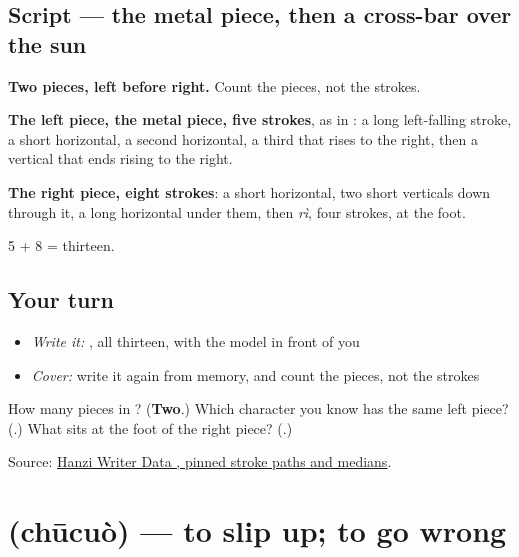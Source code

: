 \subsection*{Script — the metal piece, then a cross-bar over the sun}

\begin{quote}
\end{quote}

\textbf{Two pieces, left before right.} Count the pieces, not the strokes.

\textbf{The left piece, the metal piece, five strokes}, as in : a long left-falling stroke, a short horizontal, a second horizontal, a third that rises to the right, then a vertical that ends rising to the right.

\textbf{The right piece, eight strokes}: a short horizontal, two short verticals down through it, a long horizontal under them, then  \emph{rì}, four strokes, at the foot.

5 + 8 = thirteen.

\subsection*{Your turn}
\begin{itemize}
\raggedright
  \item \emph{Write it:} , all thirteen, with the model in front of you
  \item \emph{Cover:} write it again from memory, and count the pieces, not the strokes
\end{itemize}

\begin{tcolorbox}[breakable,colback=teal!4,colframe=teal!35!black,title={Before you move on}]
How many pieces in ? (\textbf{Two}.) Which character you know has the same left piece? (\textbf{}.) What sits at the foot of the right piece? (\textbf{}.)

Source: \href{https://raw.githubusercontent.com/chanind/hanzi-writer-data/68d10a4b21150cae5e1ebbd223eed289cf32d90c/data/\%E9\%94\%99.json}{Hanzi Writer Data , pinned stroke paths and medians}.
\end{tcolorbox}
\section[\texorpdfstring{\zh{出错} (chūcuò)}{出错 (chūcuò)}]{ (chūcuò) — to slip up; to go wrong}

